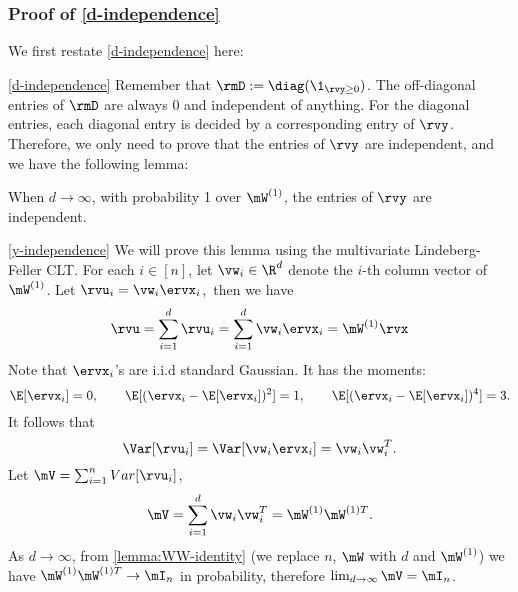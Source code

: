 \subsubsection{Proof of \cref{d-independence}}
\label{proof-d-independence}
We first restate \cref{d-independence} here:
\lemmaDindependence*
\begin{proofof}{\cref{d-independence}}
Remember that $\rmD:=\diag(\1_{\rvy\geq 0})$. The off-diagonal entries of $\rmD$ are always 0 and independent of anything. For the diagonal entries, each diagonal entry is decided by a corresponding entry of $\rvy$. Therefore, we only need to prove that the entries of $\rvy$ are independent, and we have the following lemma:
\begin{lemma}
\label{y-independence}
When $d\to \infty$, with probability 1 over $\mW^{(1)}$, the entries of $\rvy$ are independent.
\end{lemma}
\begin{proofof}{\cref{y-independence}}
We will prove this lemma using the multivariate Lindeberg-Feller CLT.
For each $i\in[n]$, let $\vw_i\in\R^d$ denote the $i$-th column vector of $\mW^{(1)}$. Let 
$\rvu_i = \vw_i\ervx_i$,\
then we have \begin{equation}
    \rvu = \sum_{i=1}^d\rvu_i=\sum_{i=1}^d\vw_i\ervx_i = \mW^{(1)}\rvx
\end{equation}
Note that $\ervx_i$'s are i.i.d standard Gaussian. It has the moments:
\begin{equation}
    \E[\ervx_i] = 0,\qquad \E[(\ervx_i - \E[\ervx_i])^2] = 1,\qquad \E[(\ervx_i - \E[\ervx_i])^4] = 3.
\end{equation}
It follows that 
\begin{equation}
   \Var[\rvu_i] = \Var[\vw_i\ervx_i] = \vw_i\vw_i^T.
\end{equation}
Let $\mV = \sum_{i=1}^n Var[\rvu_i]$,
\begin{equation}
    \mV = \sum_{i=1}^d\vw_i\vw_i^T = \mW^{(1)}\mW^{(1)T}.
\end{equation}
As $d\to\infty$, from \cref{lemma:WW-identity} (we replace $n$, $\mW$ with $d$ and $\mW^{(1)}$) we have $\mW^{(1)}\mW^{(1)T}\to \mI_n$ in probability, therefore $\lim_{d\to\infty}\mV = \mI_n$.


\end{proofof}
\end{proofof}
